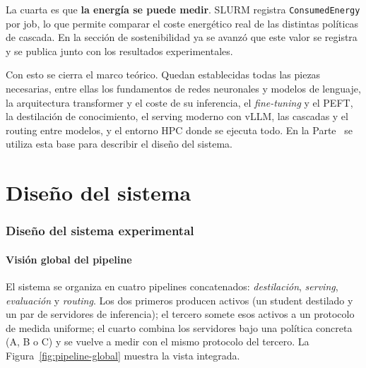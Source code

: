\documentclass[11pt,a4paper]{article}
\begin{document}
La cuarta es que \textbf{la energía se puede medir}. SLURM registra \texttt{ConsumedEnergy} por job, lo que permite comparar el coste energético real de las distintas políticas de cascada. En la sección de sostenibilidad ya se avanzó que este valor se registra y se publica junto con los resultados experimentales.

Con esto se cierra el marco teórico. Quedan establecidas todas las piezas necesarias, entre ellas los fundamentos de redes neuronales y modelos de lenguaje, la arquitectura transformer y el coste de su inferencia, el \textit{fine-tuning} y el PEFT, la destilación de conocimiento, el serving moderno con vLLM, las cascadas y el routing entre modelos, y el entorno HPC donde se ejecuta todo. En la Parte~\ref{part:diseno-sistema} se utiliza esta base para describir el diseño del sistema.

\part{Diseño del sistema}
\label{part:diseno-sistema}

\section{Diseño del sistema experimental}
\label{sec:diseno-sistema-exp}

\subsection{Visión global del pipeline}

El sistema se organiza en cuatro pipelines concatenados: \textit{destilación}, \textit{serving}, \textit{evaluación} y \textit{routing}. Los dos primeros producen activos (un student destilado y un par de servidores de inferencia); el tercero somete esos activos a un protocolo de medida uniforme; el cuarto combina los servidores bajo una política concreta (A, B o C) y se vuelve a medir con el mismo protocolo del tercero. La Figura~\ref{fig:pipeline-global} muestra la vista integrada.
\end{document}
